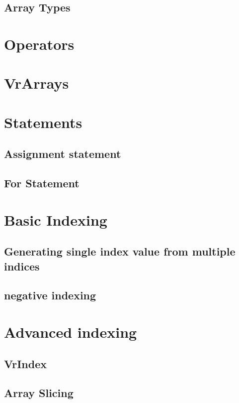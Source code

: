 \subsection{Array Types}
\section{Operators}
\section{VrArrays}
\section{Statements}
\subsection{Assignment statement}
\subsection{For Statement}
\section{Basic Indexing}
\subsection{ Generating single index value from multiple indices}
\subsection{negative indexing}
\section{Advanced indexing}
\subsection{VrIndex}
\subsection{Array Slicing}
